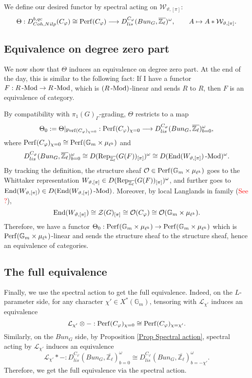 We define our desired functor by spectral acting on $\mathcal{W}_{\vartheta, [\pi]}$:
$$\Theta: D^{b, qc}_{Coh, Nilp}(C_{\varphi}) \cong \operatorname{\operatorname{Perf}}(C_{\varphi}) \longrightarrow D_{lis}^{C_{\varphi}}(Bun_G, \overline{\mathbb{Z}_{\ell}})^{\omega}, \qquad A \mapsto A*\mathcal{W}_{\vartheta, [\pi]}.$$

\subsection{Equivalence on degree zero part}

We now show that $\Theta$ induces an equivalence on degree zero part. At the end of the day, this is similar to the following fact: If I have a functor $F: R\operatorname{-Mod} \to R\operatorname{-Mod}$, which is $(R\operatorname{-Mod})$-linear and sends $R$ to $R$, then $F$ is an equivalence of category. 

By compatibility with $\pi_1(G)_{\Gamma}$-grading, $\Theta$ restricts to a map
$$\Theta_0:=\Theta|_{\operatorname{\operatorname{Perf}}(C_{\varphi})_{\chi=0}}: \operatorname{\operatorname{Perf}}(C_{\varphi})_{\chi=0} \longrightarrow D_{lis}^{C_{\varphi}}(Bun_G, \overline{\mathbb{Z}_{\ell}})^{\omega}_{b=0},$$
where $\operatorname{\operatorname{Perf}}(C_{\varphi})_{\chi=0} \cong \operatorname{\operatorname{Perf}}(\mathbb{G}_m \times \mu_{\ell^k})$ and 
$$D_{lis}^{C_{\varphi}}(Bun_G, \overline{\mathbb{Z}_{\ell}})^{\omega}_{b=0} \cong D(\operatorname{\operatorname{Rep}}_{\overline{\mathbb{Z}_{\ell}}}(G(F))_{[\pi]})^{\omega} \cong D(\operatorname{\operatorname{End}}(W_{\vartheta, [\pi]})\operatorname{-Mod})^{\omega}.$$
By tracking the definition, the structure sheaf $\mathcal{O} \in \operatorname{\operatorname{Perf}}(\mathbb{G}_m \times \mu_{\ell^k})$ goes to the Whittaker representation $W_{\vartheta, [\pi]} \in D(\operatorname{\operatorname{Rep}}_{\overline{\mathbb{Z}_{\ell}}}(G(F))_{[\pi]})^{\omega}$, and further goes to $\operatorname{\operatorname{End}}(W_{\vartheta, [\pi]}) \in D(\operatorname{\operatorname{End}}(W_{\vartheta, [\pi]})\operatorname{-Mod})$. Moreover, by local Langlands in family (\textcolor{red}{See ?}), 
$$\operatorname{\operatorname{End}}(W_{\vartheta, [\pi]}) \cong \mathcal{Z}(G)_{[\pi]} \cong \mathcal{O}(C_{\varphi}) \cong \mathcal{O}(\mathbb{G}_m \times \mu_{\ell^k}).$$ Therefore, we have a functor $\Theta_0: \operatorname{\operatorname{Perf}}(\mathbb{G}_m \times \mu_{\ell^k}) \to \operatorname{\operatorname{Perf}}(\mathbb{G}_m \times \mu_{\ell^k})$ which is $\operatorname{\operatorname{Perf}}(\mathbb{G}_m \times \mu_{\ell^k})$-linear and sends the structure sheaf to the structure sheaf, hence an equivalence of categories.

\subsection{The full equivalence}	

Finally, we use the spectral action to get the full equivalence. Indeed, on the $L$-parameter side, for any character $\chi' \in X^*(\mathbb{G}_m)$, tensoring with $\mathcal{\mathcal{L}_{\chi'}}$ induces an equivalence
$$\mathcal{\mathcal{L}_{\chi'}} \otimes -: \operatorname{\operatorname{Perf}}(C_{\varphi})_{\chi=0} \cong \operatorname{\operatorname{Perf}}(C_{\varphi})_{\chi=\chi'}.$$
Similarly, on the $Bun_G$ side, by Proposition \ref{Prop Spectral action}, spectral acting by $\mathcal{\mathcal{L}_{\chi'}}$ induces an equivalence
$$\mathcal{\mathcal{L}_{\chi'}}*-: D_{lis}^{C_{\varphi}}(Bun_G, \overline{\mathbb{Z}_{\ell}})^{\omega}_{b=0} \cong D_{lis}^{C_{\varphi}}(Bun_G, \overline{\mathbb{Z}_{\ell}})^{\omega}_{b=-\chi'}.$$ Therefore, we get the full equivalence via the spectral action.
	
